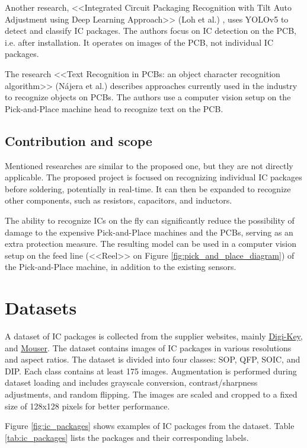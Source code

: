 \documentclass[preprint,12pt,3p,times]{elsarticle}
\begin{document}
Another research, <<Integrated Circuit Packaging Recognition with Tilt Auto Adjustment using Deep Learning Approach>> (Loh et al.) \cite{ComponentsDetection}, uses YOLOv5 to detect and classify IC packages. The authors focus on IC detection on the PCB, i.e. after installation. It operates on images of the PCB, not individual IC packages.

The research <<Text Recognition in PCBs: an object character recognition algorithm>> (Nájera et al.) \cite{pickandplace} describes approaches currently used in the industry to recognize objects on PCBs. The authors use a computer vision setup on the Pick-and-Place machine head to recognize text on the PCB.

\subsection{Contribution and scope}
Mentioned researches are similar to the proposed one, but they are not directly applicable. The proposed project is focused on recognizing individual IC packages before soldering, potentially in real-time. It can then be expanded to recognize other components, such as resistors, capacitors, and inductors.

The ability to recognize ICs on the fly can significantly reduce the possibility of damage to the expensive Pick-and-Place machines and the PCBs, serving as an extra protection measure. The resulting model can be used in a computer vision setup on the feed line (<<Reel>> on Figure \ref{fig:pick_and_place_diagram}) of the Pick-and-Place machine, in addition to the existing sensors.

\section{Datasets}
A dataset of IC packages is collected from the supplier websites, mainly \href{https://digikey.com}{Digi-Key}, and \href{https://mouser.com}{Mouser}. The dataset contains images of IC packages in various resolutions and aspect ratios. The dataset is divided into four classes: SOP, QFP, SOIC, and DIP. Each class contains at least 175 images. Augmentation is performed during dataset loading and includes grayscale conversion, contrast/sharpness adjustments, and random flipping. The images are scaled and cropped to a fixed size of 128x128 pixels for better performance.

Figure \ref{fig:ic_packages} shows examples of IC packages from the dataset. Table \ref{tab:ic_packages} lists the packages and their corresponding labels.
\end{document}
